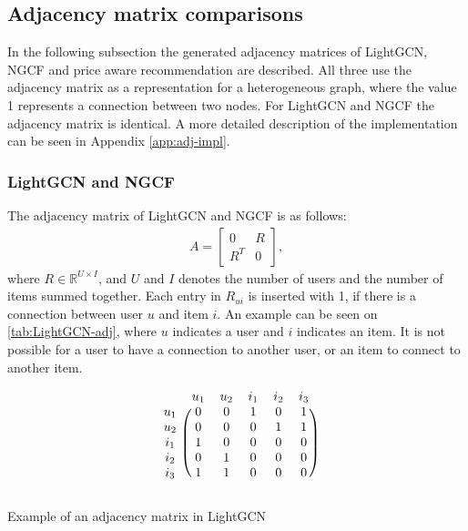\subsection{Adjacency matrix comparisons}\label{subsubsec:lightGCN-adj}
In the following subsection the generated adjacency matrices of LightGCN, NGCF and price aware recommendation are described.
All three use the adjacency matrix as a representation for a heterogeneous graph, where the value 1 represents a connection between two nodes.
For LightGCN and NGCF the adjacency matrix is identical.
A more detailed description of the implementation can be seen in Appendix \ref{app:adj-impl}.

\subsubsection{LightGCN and NGCF}
The adjacency matrix of LightGCN and NGCF is as follows:
\begin{gather}
    A =
    \begin{bmatrix}
        0   & R \\
        R^T & 0
    \end{bmatrix},
\end{gather}
where $R \in \mathbb{R}^{U \times I}$, and $U$ and $I$ denotes the number of users and the number of items summed together.
Each entry in $R_{ui}$ is inserted with 1, if there is a connection between user $u$ and item $i$.
An example can be seen on \autoref{tab:LightGCN-adj}, where $u$ indicates a user and $i$ indicates an item.
It is not possible for a user to have a connection to another user, or an item to connect to another item.
\begin{table}

    \[
        \begin{blockarray}{cccccc}
            & u_1 & u_2 & i_1 & i_2 & i_3 \\
            \begin{block}{c(ccccc)}
                u_1 & 0 & 0 & 1 & 0 & 1   \\
                u_2 & 0 & 0 & 0 & 1 & 1   \\
                i_1 & 1 & 0 & 0 & 0 & 0   \\
                i_2 & 0 & 1 & 0 & 0 & 0   \\
                i_3 & 1 & 1 & 0 & 0 & 0   \\
            \end{block}
        \end{blockarray}
    \]
    \caption{Example of an adjacency matrix in LightGCN}
    \label{tab:LightGCN-adj}
\end{table}

